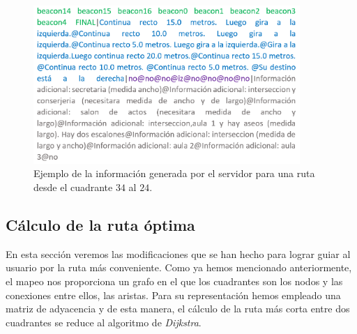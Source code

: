 \begin{figure}[t]
	\centering
	\includegraphics[width=0.9\textwidth]{Imagenes/Capitulo4/ejemploRuta}
	\caption{Ejemplo de la información generada por el servidor para una ruta desde el cuadrante $34$ al $24$.}
	\label{fig:ejemplo_ruta}
\end{figure}


\subsection{Cálculo de la ruta óptima}
\label{sub:rutaOptima}

En esta sección veremos las modificaciones que se han hecho para lograr guiar al usuario por la ruta más conveniente. Como ya hemos mencionado anteriormente, el mapeo nos proporciona un grafo en el que los cuadrantes son los nodos y las conexiones entre ellos, las aristas. Para su representación hemos empleado una matriz de adyacencia y de esta manera, el cálculo de la ruta más corta entre dos cuadrantes se reduce al algoritmo de \textit{Dijkstra}.

